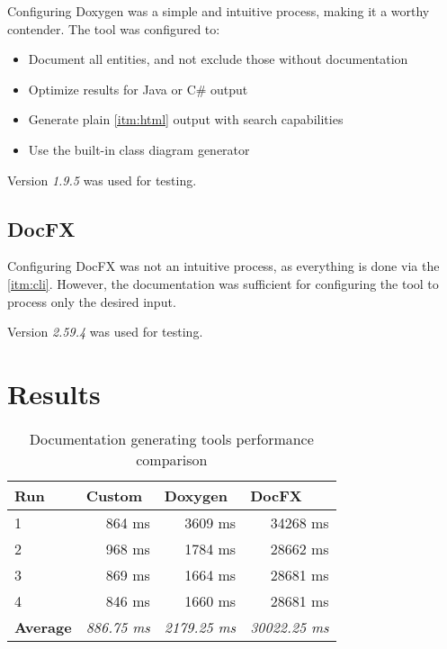 Configuring Doxygen was a simple and intuitive process, making it a worthy contender. The tool was configured to:
\begin{itemize}
    \item Document all entities, and not exclude those without documentation
    \item Optimize results for Java or C\# output
    \item Generate plain \ref{itm:html} output with search capabilities
    \item Use the built-in class diagram generator
\end{itemize}

Version \textit{1.9.5} was used for testing.

\subsection{DocFX}

Configuring DocFX was not an intuitive process, as everything is done via the \ref{itm:cli}. However, the documentation was sufficient for configuring the tool to process only the desired input.

Version \textit{2.59.4} was used for testing.

\section{Results}

\begin{table}[H]
    \centering
    \label{tab:toolPerformance}
    \begin{tabular}{lrrr}
    \hline
    \textbf{Run}            & \multicolumn{1}{l}{\textbf{Custom}}    & \multicolumn{1}{l}{\textbf{Doxygen}}    & \multicolumn{1}{l}{\textbf{DocFX}}       \\ \hline
    \multicolumn{1}{|l|}{1} & \multicolumn{1}{r|}{864 ms}            & \multicolumn{1}{r|}{3609 ms}            & \multicolumn{1}{r|}{34268 ms}            \\ \hline
    \multicolumn{1}{|l|}{2} & \multicolumn{1}{r|}{968 ms}            & \multicolumn{1}{r|}{1784 ms}            & \multicolumn{1}{r|}{28662 ms}            \\ \hline
    \multicolumn{1}{|l|}{3} & \multicolumn{1}{r|}{869 ms}            & \multicolumn{1}{r|}{1664 ms}            & \multicolumn{1}{r|}{28681 ms}            \\ \hline
    \multicolumn{1}{|l|}{4} & \multicolumn{1}{r|}{846 ms}            & \multicolumn{1}{r|}{1660 ms}            & \multicolumn{1}{r|}{28681 ms}            \\ \hline
    \textbf{Average}        & \multicolumn{1}{l}{\textit{886.75 ms}} & \multicolumn{1}{l}{\textit{2179.25 ms}} & \multicolumn{1}{l}{\textit{30022.25 ms}} \\ \hline
    \end{tabular}
    \caption{Documentation generating tools performance comparison}
\end{table}


